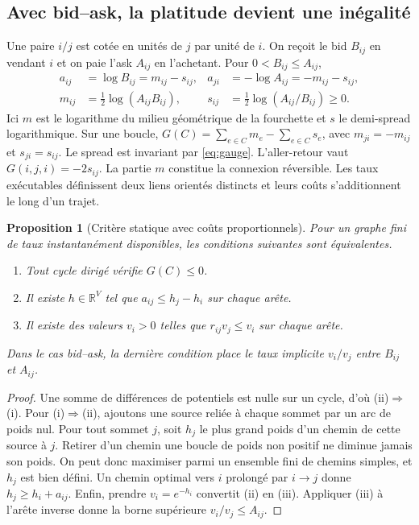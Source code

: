 \documentclass[11pt,a4paper]{article}
\theoremstyle{clair}
\newtheorem{proposition}{Proposition}[section]
\newcommand{\R}{\mathbb{R}}
\newcommand{\arrowfx}{\mathbin{\to}}
\begin{document}
\subsection{Avec bid--ask, la platitude devient une inégalité}

Une paire $i/j$ est cotée en unités de $j$ par unité de $i$. On reçoit le bid $B_{ij}$ en vendant $i$ et on paie l'ask $A_{ij}$ en l'achetant. Pour $0<B_{ij}\le A_{ij}$,
\begin{equation}
\begin{aligned}
 a_{ij}&=\log B_{ij}=m_{ij}-s_{ij},&
 a_{ji}&=-\log A_{ij}=-m_{ij}-s_{ij},\\
 m_{ij}&=\tfrac12\log(A_{ij}B_{ij}),&
 s_{ij}&=\tfrac12\log(A_{ij}/B_{ij})\ge0.
\end{aligned}
 \label{eq:mid}
\end{equation}
Ici $m$ est le logarithme du milieu géométrique de la fourchette et $s$ le demi-spread logarithmique. Sur une boucle, $G(C)=\sum_{e\in C}m_e-\sum_{e\in C}s_e$, avec $m_{ji}=-m_{ij}$ et $s_{ji}=s_{ij}$. Le spread est invariant par \eqref{eq:gauge}. L'aller-retour vaut $G(i,j,i)=-2s_{ij}$. La partie $m$ constitue la connexion réversible. Les taux exécutables définissent deux liens orientés distincts et leurs coûts s'additionnent le long d'un trajet.

\begin{proposition}[Critère statique avec coûts proportionnels]
\label{prop:static}
Pour un graphe fini de taux instantanément disponibles, les conditions suivantes sont équivalentes.
\begin{enumerate}[label=\textnormal{(\roman*)}]
 \item Tout cycle dirigé vérifie $G(C)\le0$.
 \item Il existe $h\in\R^{V}$ tel que $a_{ij}\le h_j-h_i$ sur chaque arête.
 \item Il existe des valeurs $v_i>0$ telles que $r_{ij}v_j\le v_i$ sur chaque arête.
\end{enumerate}
Dans le cas bid--ask, la dernière condition place le taux implicite $v_i/v_j$ entre $B_{ij}$ et $A_{ij}$.
\end{proposition}

\begin{proof}
Une somme de différences de potentiels est nulle sur un cycle, d'où (ii)$\Rightarrow$(i). Pour (i)$\Rightarrow$(ii), ajoutons une source reliée à chaque sommet par un arc de poids nul. Pour tout sommet $j$, soit $h_j$ le plus grand poids d'un chemin de cette source à $j$. Retirer d'un chemin une boucle de poids non positif ne diminue jamais son poids. On peut donc maximiser parmi un ensemble fini de chemins simples, et $h_j$ est bien défini. Un chemin optimal vers $i$ prolongé par $i\arrowfx j$ donne $h_j\ge h_i+a_{ij}$. Enfin, prendre $v_i=e^{-h_i}$ convertit (ii) en (iii). Appliquer (iii) à l'arête inverse donne la borne supérieure $v_i/v_j\le A_{ij}$.
\end{proof}
\end{document}

